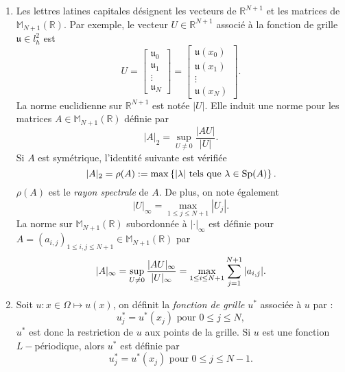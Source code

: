 \begin{enumerate}
\item Les lettres latines capitales désignent les vecteurs de $\mathbb{R}^{N+1}$ et les matrices de $\mathbb{M}_{N+1}(\mathbb{R})$. Par exemple, le vecteur $U \in \mathbb{R}^{N+1}$ associé à la fonction de grille $\mathfrak{u} \in l^2_h$ est
\begin{equation}
U = \begin{bmatrix}
\mathfrak{u}_0 \\ \mathfrak{u}_1 \\ \vdots \\ \mathfrak{u}_N
\end{bmatrix} =
\begin{bmatrix}
\mathfrak{u}(x_0) \\ \mathfrak{u}(x_1) \\ \vdots \\ \mathfrak{u}(x_N)
\end{bmatrix}.
\end{equation}
La norme euclidienne sur $\mathbb{R}^{N+1}$ est notée $|U|$. Elle induit une norme pour les matrices $A \in \mathbb{M}_{N+1}(\mathbb{R})$ définie par
\begin{equation}
|A|_2 = \sup_{U \neq 0} \dfrac{|AU|}{|U|}.
\end{equation}
Si $A$ est symétrique, l'identité suivante est vérifiée
\begin{equation}
|A|_2 = \rho(A) := \max \left\lbrace |\lambda| \text{ tels que } \lambda \in \text{Sp} (A) \right\rbrace.
\end{equation}
$\rho(A)$ est le \textit{rayon spectrale} de $A$.
De plus, on note également
\begin{equation}
|U|_{\infty} = \max_{1 \leq j \leq N+1} |U_j|.
\end{equation}
La norme sur $\mathbb{M}_{N+1}(\mathbb{R})$ subordonnée à $|\cdot|_{\infty}$ est définie pour $A=(a_{i,j})_{1 \leq i,j \leq N+1} \in \mathbb{M}_{N+1}(\mathbb{R})$ par
\begin{equation}
|A|_{\infty} = \sup_{U \neq 0} \dfrac{|AU|_{\infty}}{|U|_{\infty}} = \max_{1 \leq i \leq N+1} \displaystyle\sum\limits_{j=1}^{N+1} |a_{i,j}|.
\end{equation}



\item Soit $u: x \in \Omega \mapsto u(x)$, on définit la \textit{fonction de grille} $u^*$ associée à $u$ par :
\begin{equation}
u^*_j = u^*(x_j) \text{ pour } 0 \leq j \leq N,
\end{equation}
$u^*$ est donc la restriction de $u$ aux points de la grille. Si $u$ est une fonction $L-$périodique, alors $u^*$ est définie par
\begin{equation}
u^*_j = u^*(x_j) \text{ pour } 0 \leq j \leq N-1.
\end{equation}
\end{enumerate}

